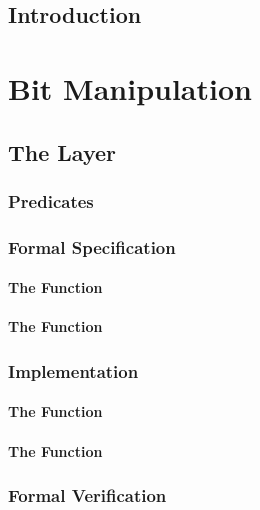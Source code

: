 \documentclass[paper=a4,12pt,DIV16,BCOR8mm,twoside]{scrreprt}
\begin{document}

%
%
%

\tableofcontents

\chapter{Introduction}

\part{Bit Manipulation}



\chapter{The  Layer}

\section{Predicates}

\section{Formal Specification}
\subsection{The Function }
\subsection{The Function }

\section{Implementation}
\subsection{The Function }
\subsection{The Function }

\section{Formal Verification}
\end{document}
